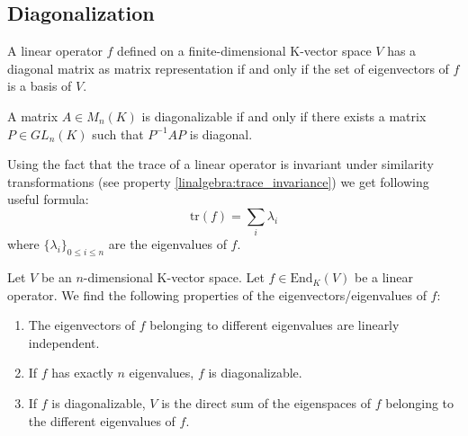     \subsection{Diagonalization}
    
    	\begin{theorem}
			\label{linalgebra:theorem:diagonalizable_basis}
            A linear operator $f$ defined on a finite-dimensional K-vector space $V$ has a diagonal matrix as matrix representation if and only if the set of eigenvectors of $f$ is a basis of $V$.
		\end{theorem}
		
        \begin{theorem}
        	\label{linalgebra:theorem:diagonalizable_PQP}
            A matrix $A\in M_n(K)$ is diagonalizable if and only if there exists a matrix $P\in GL_n(K)$ such that $P^{-1}AP$ is diagonal.
        \end{theorem}
        \begin{result}
        	Using the fact that the trace of a linear operator is invariant under similarity transformations (see property \ref{linalgebra:trace_invariance}) we get following useful formula:
            \begin{equation}
            	\boxed{\text{tr}(f) = \sum_i\lambda_i}
            \end{equation}
            where $\{\lambda_i\}_{0\leq i\leq n}$ are the eigenvalues of $f$.
        \end{result}
        
        \begin{property}
        	\label{linalgebra:diagonalization_properties}
			Let $V$ be an $n$-dimensional K-vector space. Let $f\in \text{End}_K(V)$ be a linear operator. We find the following properties of the eigenvectors/eigenvalues of $f$:
            \begin{enumerate}
				\item The eigenvectors of $f$ belonging to different eigenvalues are linearly independent.
                \item If $f$ has exactly $n$ eigenvalues, $f$ is diagonalizable.
                \item If $f$ is diagonalizable, $V$ is the direct sum of the eigenspaces of $f$ belonging to the different eigenvalues of $f$.
			\end{enumerate}
		\end{property}
        
